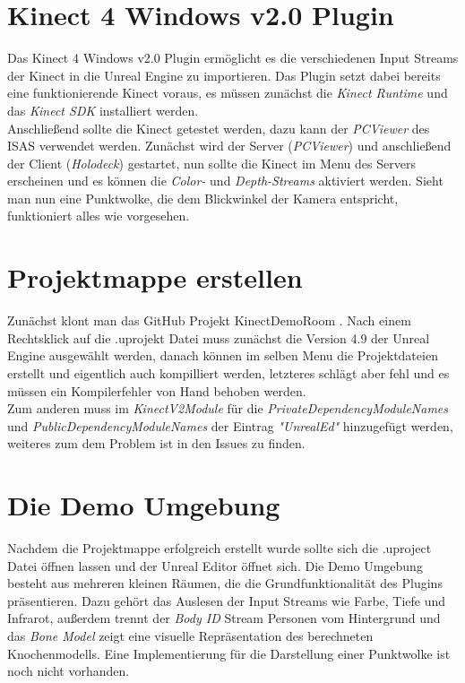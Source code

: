 \documentclass[a4paper]{IEEEtran}
\begin{document}
	
\section{Kinect 4 Windows v2.0 Plugin}
	Das Kinect 4 Windows v2.0 Plugin ermöglicht es die verschiedenen Input Streams der Kinect in die Unreal Engine zu importieren. Das Plugin setzt dabei bereits eine funktionierende Kinect voraus, es müssen zunächst die {\textit{Kinect Runtime}} {\cite{kinectruntime}} und das {\textit{Kinect SDK}} {\cite{kinectsdk}} installiert werden. \\
	Anschließend sollte die Kinect getestet werden, dazu kann der {\textit{PCViewer}} des ISAS verwendet werden. 
	Zunächst wird der Server ({\textit{PCViewer}}) und anschließend der Client ({\textit{Holodeck}}) gestartet, nun sollte die Kinect im Menu des Servers erscheinen und es können die {\textit{Color-}} und {\textit{Depth-Streams}} aktiviert werden. 
	Sieht man nun eine Punktwolke, die dem Blickwinkel der Kamera entspricht, funktioniert alles wie vorgesehen.\\
	

\section{Projektmappe erstellen}
	Zunächst klont man das GitHub Projekt KinectDemoRoom {\cite{k4w}}. 
	Nach einem Rechtsklick auf die .uprojekt Datei muss zunächst die Version 4.9 der Unreal Engine ausgewählt werden, danach können im selben Menu die Projektdateien erstellt und eigentlich auch kompilliert werden, letzteres schlägt aber fehl und es müssen ein Kompilerfehler von Hand behoben werden. \\
	Zum anderen muss im {\textit{KinectV2Module}} für die {\textit{PrivateDependencyModuleNames}} und {\textit{PublicDependencyModuleNames}} der Eintrag {\textit{"{}UnrealEd"{}}} hinzugefügt werden, weiteres zum dem Problem ist in den Issues {\cite{k4wissues}} zu finden.\\

\section{Die Demo Umgebung}
	Nachdem die Projektmappe erfolgreich erstellt wurde sollte sich die .uproject Datei öffnen lassen und der Unreal Editor öffnet sich. 
	Die Demo Umgebung besteht aus mehreren kleinen Räumen, die die Grundfunktionalität des Plugins präsentieren. 
	Dazu gehört das Auslesen der Input Streams wie Farbe, Tiefe und Infrarot, außerdem trennt der {\textit{Body ID}} Stream Personen vom Hintergrund und das {\textit{Bone Model}} zeigt eine visuelle Repräsentation des berechneten Knochenmodells. 
	Eine Implementierung für die Darstellung einer Punktwolke ist noch nicht vorhanden. \\[0.5cm]
	
\end{document}

